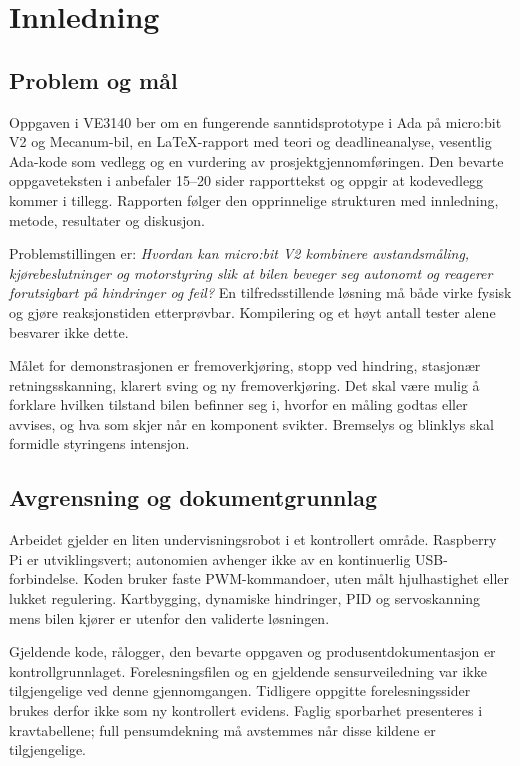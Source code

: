 \chapter{Innledning}
\label{ch:intro}
\section{Problem og mål}
Oppgaven i VE3140 ber om en fungerende sanntidsprototype i Ada på micro:bit V2
og Mecanum-bil, en LaTeX-rapport med teori og deadlineanalyse, vesentlig
Ada-kode som vedlegg og en vurdering av prosjektgjennomføringen. Den bevarte
oppgaveteksten i  anbefaler 15--20 sider
rapporttekst og oppgir at kodevedlegg kommer i tillegg. Rapporten følger
den opprinnelige strukturen med innledning, metode, resultater og diskusjon.

Problemstillingen er: \emph{Hvordan kan micro:bit V2 kombinere avstandsmåling,
kjørebeslutninger og motorstyring slik at bilen beveger seg autonomt og
reagerer forutsigbart på hindringer og feil?} En tilfredsstillende løsning
må både virke fysisk og gjøre reaksjonstiden etterprøvbar. Kompilering og
et høyt antall tester alene besvarer ikke dette.

Målet for demonstrasjonen er fremoverkjøring, stopp ved hindring,
stasjonær retningsskanning, klarert sving og ny fremoverkjøring. Det skal
være mulig å forklare hvilken tilstand bilen befinner seg i, hvorfor en
måling godtas eller avvises, og hva som skjer når en komponent svikter.
Bremselys og blinklys skal formidle styringens intensjon.

\section{Avgrensning og dokumentgrunnlag}
Arbeidet gjelder en liten undervisningsrobot i et kontrollert område.
Raspberry Pi er utviklingsvert; autonomien avhenger ikke av en kontinuerlig
USB-forbindelse. Koden bruker faste PWM-kommandoer, uten målt hjulhastighet
eller lukket regulering. Kartbygging, dynamiske hindringer, PID og
servoskanning mens bilen kjører er utenfor den validerte løsningen.

Gjeldende kode, rålogger, den bevarte oppgaven og produsentdokumentasjon er
kontrollgrunnlaget. Forelesningsfilen  og en
gjeldende sensurveiledning var ikke tilgjengelige ved denne gjennomgangen.
Tidligere oppgitte forelesningssider brukes derfor ikke som ny kontrollert
evidens. Faglig sporbarhet presenteres i kravtabellene; full pensumdekning
må avstemmes når disse kildene er tilgjengelige.

